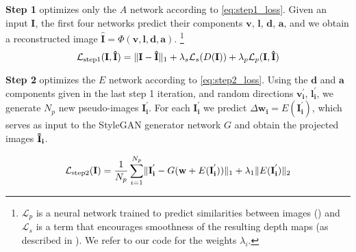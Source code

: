 \textbf{Step 1} optimizes only the $A$ network according to \autoref{eq:step1_loss}. Given an input $\mathbf{I}$, the first four networks predict their components $\mathbf{v}$, $\mathbf{l}$, $\mathbf{d}$, $\mathbf{a}$, and we obtain a reconstructed image $\mathbf{\hat{I}} = \Phi(\mathbf{v}, \mathbf{l},  \mathbf{d}, \mathbf{a})$. \footnote{$\mathcal{L}_{p}$ is a neural network trained to predict similarities between images (\cite{perceptual}) and $\mathcal{L}_s$ is a term that encourages smoothness of the resulting depth maps (as described in \cite{smooth-loss}). We refer to our code for the weights $\lambda_i$.}
\begin{equation}
    \mathcal{L}_{\textrm{step1}}(\mathbf{I}, \mathbf{\hat{I}}) = 
    \lVert\mathbf{I} - 
    \mathbf{\hat{I}}\rVert_1
     + \lambda_{s}\mathcal{L}_{s}(D(\mathbf{I})) + \lambda_p \mathcal{L}_{p}(\mathbf{I}, \mathbf{\hat{I}})
    \label{eq:step1_loss}
\end{equation}

\textbf{Step 2}  optimizes the $E$ network according to \autoref{eq:step2_loss}. Using the $\mathbf{d}$ and  $\mathbf{a}$ components given in the last step 1 iteration, and random directions $\mathbf{v_{i}^{'}}$, $\mathbf{l_{i}^{'}}$, we generate $N_p$ new pseudo-images $\mathbf{I_{i}^{'}}$.
For each $\mathbf{I_{i}^{'}}$ we predict $\Delta \mathbf{w_i} = E(\mathbf{I_{i}^{'}})$, which serves as input to the StyleGAN generator network $G$ and obtain the projected images $\mathbf{\Tilde{I}_i}$. 

\begin{equation}
    \mathcal{L}_{\textrm{step2}}(\mathbf{I}) = \frac{1}{N_p}
    \sum_{i=1}^{N_p} \lVert\mathbf{I_{i}^{'}} - 
    G(\mathbf{w} + E(\mathbf{I_{i}^{'}}))
    \rVert_1 + \lambda_1 \lVert E(\mathbf{I_{i}^{'}})\rVert_2
    \label{eq:step2_loss}
\end{equation}



